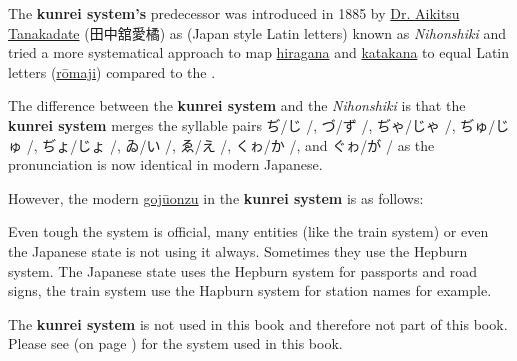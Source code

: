 The \textbf{kunrei system's} predecessor was introduced in 1885 by \Link
\href{https://en.wikipedia.org/wiki/Tanakadate_Aikitsu}{Dr. Aikitsu Tanakadate}
({田中舘愛橘}) as
(Japan style Latin letters) known as \textit{Nihonshiki} and tried a more
systematical approach to map \hyperref[sec:Hiragana]{hiragana} and
\hyperref[sec:Katakana]{katakana} to equal Latin letters
(\hyperref[sec:Romaji]{rōmaji}) compared to the .

The difference between the \textbf{kunrei system} and the \textit{Nihonshiki}
is that the \textbf{kunrei system} merges the syllable pairs ぢ/じ /,
づ/ず /, ぢゃ/じゃ /, ぢゅ/じゅ /, ぢょ/じょ
/, ゐ/い /, ゑ/え /, くゎ/か /, and ぐゎ/が
/ as the pronunciation is now identical in modern Japanese.

However, the modern \hyperref[sec:Gojuonzu]{gojūonzu} in the \textbf{kunrei
system} is as follows:


Even tough the system is official, many entities (like the train system) or
even the Japanese state is not using it always. Sometimes they use the Hepburn
system. The Japanese state uses the Hepburn system for passports and road
signs, the train system use the Hapburn system for station names for example.

The \textbf{kunrei system} is not used in this book and therefore not part of
this book. Please see  (on page \pageref{sec:Hepburn}) for
the system used in this book.
